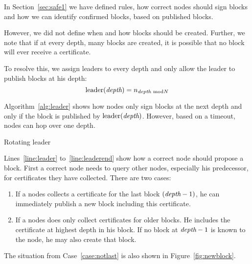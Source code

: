 
\noindent
In Section~\ref{sec:safe1} we have defined rules, how correct nodes should sign blocks and how we can identify confirmed blocks, based on published blocks.

However, we did not define when and how blocks should be created. Further, we note that if at every depth, many blocks are created, it is possible that no block will ever receive a certificate.

To resolve this, we assign leaders to every depth and only allow the leader to publish blocks at his depth:
\[
\textrm{leader}(\textit{depth})=n_{\textit{depth}\ \text{mod} N}
\]

Algorithm~\ref{alg:leader} shows how nodes only sign blocks at the next depth and only if the block is published by $\textrm{leader}(\textit{depth})$.
However, based on a timeout, nodes can hop over one depth.

\begin{algorithm}
	\caption{Rotating leader}
	\label{alg:leader}
	\begin{algorithmic}[1]
				\State{$\depth++$}
			\EndIf
		\EOn
			\State{$\depth++$}
		\EOn
		\label{line:leader}
			\label{line:wait}
			\EndIf
			\label{line:leaderend}
		\EOn
	\end{algorithmic}
\end{algorithm}	

Lines~\ref{line:leader} to~\ref{line:leaderend} show how a correct node should propose a block. 
First a correct node needs to query other nodes, especially his predecessor, for certificates they have collected.
There are two cases:
\begin{enumerate}[label=\alph*)]
	\item If a nodes collects a certificate for the last block $(\textit{depth}-1)$, he can immediately publish a new block including this certificate.
	\item\label{case:notlast} If a nodes does only collect certificates for older blocks. He includes the certificate at highest depth in his block. If no block at $\textit{depth}-1$ is known to the node, he may also create that block.
\end{enumerate}
The situation from Case~\ref{case:notlast} is also shown in Figure~\ref{fig:newblock}.

